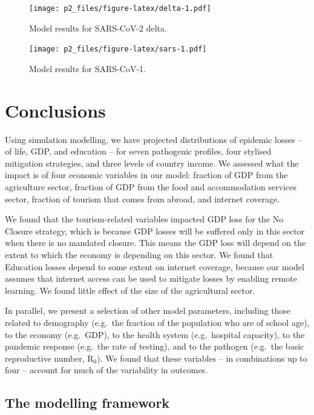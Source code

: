 \documentclass[
]{article}
\begin{document}
\begin{figure}
\centering
\texttt{[image: p2\_files/figure-latex/delta-1.pdf]}
\caption{\label{fig:delta}Model results for SARS-CoV-2 delta.}
\end{figure}

\begin{figure}
\centering
\texttt{[image: p2\_files/figure-latex/sars-1.pdf]}
\caption{\label{fig:sars}Model results for SARS-CoV-1.}
\end{figure}

\newpage

\hypertarget{conclusions}{%
\section{Conclusions}\label{conclusions}}

Using simulation modelling, we have projected distributions of epidemic losses -- of life, GDP, and education -- for seven pathogenic profiles, four stylised mitigation strategies, and three levels of country income. We assessed what the impact is of four economic variables in our model: fraction of GDP from the agriculture sector, fraction of GDP from the food and accommodation services sector, fraction of tourism that comes from abroad, and internet coverage.

We found that the tourism-related variables impacted GDP loss for the No Closure strategy, which is because GDP losses will be suffered only in this sector when there is no mandated closure. This means the GDP loss will depend on the extent to which the economy is depending on this sector. We found that Education losses depend to some extent on internet coverage, because our model assumes that internet access can be used to mitigate losses by enabling remote learning. We found little effect of the size of the agricultural sector.

In parallel, we present a selection of other model parameters, including those related to demography (e.g.~the fraction of the population who are of school age), to the economy (e.g.~GDP), to the health system (e.g.~hospital capacity), to the pandemic response (e.g.~the rate of testing), and to the pathogen (e.g.~the basic reproductive number, R\(_0\)). We found that these variables -- in combinations up to four -- account for much of the variability in outcomes.

\hypertarget{the-modelling-framework}{%
\subsection{The modelling framework}\label{the-modelling-framework}}
\end{document}
